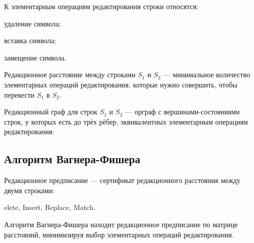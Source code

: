 К {\bold элементарным операциям редактирования} строки относятся:
\begin{list*}
\item {\ital удаление} символа;
\item {\ital вставка} символа;
\item {\ital замещение} символа.
\end{list*} 
{\bold Редакционное расстояние} между строками $S_1$ и $S_2$ --- минимальное количество {\ital элементарных операций редактирования}, которые нужно совершить, чтобы перевести $S_1$ в $S_2$.

{\bold Редакционный граф} для строк $S_1$ и $S_2$ --- орграф с вершинами-состояниями строк, у которых есть до трёх рёбер, {\ital эквивалентных} элементарным операциям редактирования:

{\centering
{}\par}

\subsection{Алгоритм Вагнера-Фишера}

{\bold Редакционное предписание} --- сертификат редакционного расстояния между двумя строками:

{elete, {\bold I}nsert, {\bold R}eplace, {\bold M}atch.\par}

{\bold Алгоритм Вагнера-Фишера} находит редакционное предписание по {\ital матрице расстояний}, минимизируя выбор элементарных операций редактирования.

